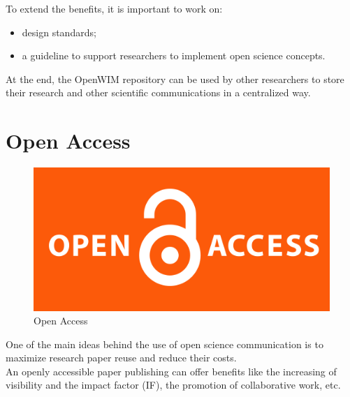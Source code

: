 \documentclass[a0,portrait]{a0poster}
\begin{document}
\begin{multicols}{2}
To extend the benefits, it is important to work on:

\begin{itemize}
\item design standards;
\item a guideline to support researchers to implement open science concepts.
\end{itemize}
\hfill

At the end, the OpenWIM repository can be used by other researchers to store their research and other scientific communications in a centralized way.


\color{black} %

\section*{Open Access}

\begin{figure}
  \begin{center}
    \includegraphics[width=500px]{openaccess.png}
  \end{center} 
  \caption{Open Access}
\end{figure}

One of the main ideas behind the use of open science communication is to maximize research paper reuse and reduce their costs.\\

An openly accessible paper publishing can offer benefits like  the increasing of visibility and the impact factor (IF), the promotion of collaborative work, etc.\\


\end{multicols}
\end{document}

